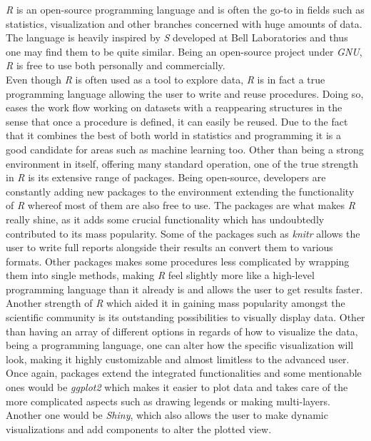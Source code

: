 \documentclass[Report.tex]{subfiles}
\begin{document}
 
\textit{R} is an open-source programming language and is often the go-to in fields such as statistics, visualization and other branches concerned with huge amounts of data. The language is heavily inspired by \textit{S} developed at Bell Laboratories and thus one may find them to be quite similar. Being an open-source project under \textit{GNU}, \textit{R} is free to use both personally and commercially.\\

 Even though \textit{R} is often used as a tool to explore data, \textit{R} is in fact a true programming language allowing the user to write and reuse procedures. Doing so, eases the work flow working on datasets with a reappearing structures in the sense that once a procedure is defined, it can easily be reused. Due to the fact that it combines the best of both world in statistics and programming  it is a good candidate for areas such as machine learning too. Other than being a strong environment in itself, offering many standard operation, one of the true strength in \textit{R} is its extensive range of packages. Being open-source, developers are constantly adding new packages to the environment extending the functionality of \textit{R} whereof most of them are also free to use. The packages are what makes \textit{R} really shine, as it adds some crucial functionality which has undoubtedly contributed to its mass popularity. Some of the packages such as \textit{knitr} allows the user to write full reports alongside their results an convert them to various formats. Other packages makes some procedures less complicated by wrapping them into single methods, making \textit{R} feel slightly more like a high-level programming language than it already is and allows the user to get results faster. Another strength of \textit{R} which aided it in gaining mass popularity amongst the scientific community is its outstanding possibilities to visually display data. Other than having an array of different options in regards of how to visualize the data, being a programming language, one can alter how the specific visualization will look, making it highly customizable and almost limitless to the advanced user. Once again, packages extend the integrated functionalities and some mentionable ones would be \textit{ggplot2} which makes it easier to plot data and takes care of the more complicated aspects such as drawing legends or making multi-layers. Another one would be \textit{Shiny}, which also allows the user to make dynamic visualizations and add components to alter the plotted view. \\
 
\end{document}
